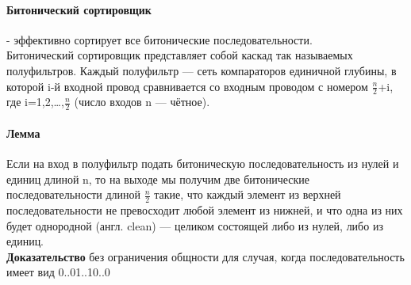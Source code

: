 \documentclass[a4paper,10pt]{article}
\begin{document}
\paragraph{Битонический сортировщик} - эффективно сортирует все битонические последовательности.\\
Битонический сортировщик представляет собой каскад так называемых полуфильтров. Каждый полуфильтр — сеть компараторов единичной глубины, в которой i-й входной провод сравнивается со входным проводом с номером $\frac{n}{2}$+i, где i=1,2,…,$\frac{n}{2}$ (число входов n — чётное).\\
\paragraph{Лемма} Если на вход в полуфильтр подать битоническую последовательность из нулей и единиц длиной n, то на выходе мы получим две битонические последовательности длиной $\frac{n}{2}$ такие, что каждый элемент из верхней последовательности не превосходит любой элемент из нижней, и что одна из них будет однородной (англ. clean) — целиком состоящей либо из нулей, либо из единиц.\\
\textbf{Доказательство}  без ограничения общности для случая, когда последовательность имеет вид 0..01..10..0\\
\end{document}

